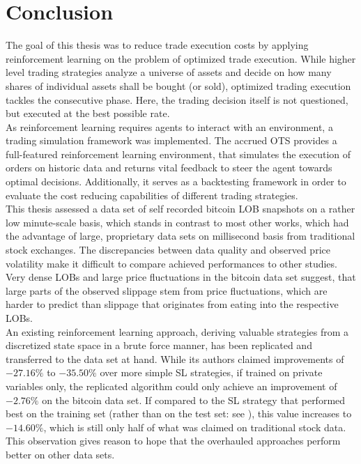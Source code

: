 \chapter{Conclusion}\label{chap:conclusion}
The goal of this thesis was to reduce trade execution costs by applying reinforcement learning on the problem of optimized trade execution. While higher level trading strategies analyze a universe of assets and decide on how many shares of individual assets shall be bought (or sold), optimized trading execution tackles the consecutive phase. Here, the trading decision itself is not questioned, but executed at the best possible rate.\\

As reinforcement learning requires agents to interact with an environment, a trading simulation framework was implemented. The accrued \ac{OTS} provides a full-featured reinforcement learning environment, that simulates the execution of orders on historic data and returns vital feedback to steer the agent towards optimal decisions. Additionally, it serves as a backtesting framework in order to evaluate the cost reducing capabilities of different trading strategies.\\

This thesis assessed a data set of self recorded bitcoin \ac{LOB} snapshots on a rather low minute-scale basis, which stands in contrast to most other works, which had the advantage of large, proprietary data sets on millisecond basis from traditional stock exchanges. The discrepancies between data quality and observed price volatility make it difficult to compare achieved performances to other studies. Very dense \ac{LOB}s and large price fluctuations in the bitcoin data set suggest, that large parts of the observed slippage stem from price fluctuations, which are harder to predict than slippage that originates from eating into the respective \ac{LOB}s.\\

An existing reinforcement learning approach, deriving valuable strategies from a discretized state space in a brute force manner, has been replicated and transferred to the data set at hand. While its authors claimed improvements of $-27.16\%$ to $-35.50\%$ over more simple \ac{SL} strategies, if trained on private variables only, the replicated algorithm could only achieve an improvement of $-2.76\%$ on the bitcoin data set. If compared to the \ac{SL} strategy that performed best on the training set (rather than on the test set: see ), this value increases to $-14.60\%$, which is still only half of what was claimed on traditional stock data. This observation gives reason to hope that the overhauled approaches perform better on other data sets.\\

